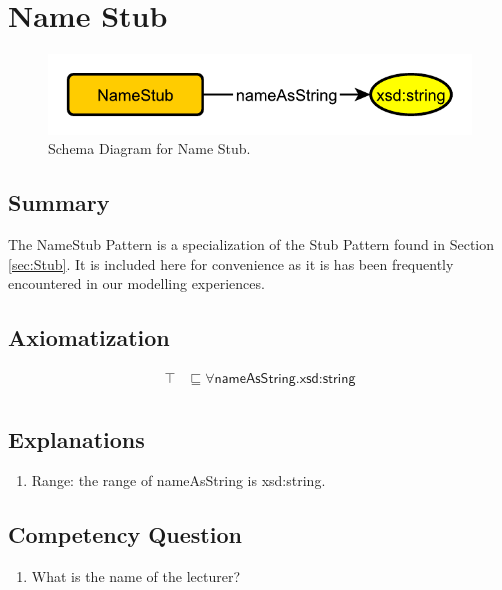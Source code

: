 \section{Name Stub}
\label{sec:Name}
\begin{figure}[h!]
\begin{center}
\includegraphics[width=.7\textwidth]{figures/name}
\end{center}
\caption{Schema Diagram for Name Stub.}
\label{fig:Name}
\end{figure}
\subsection{Summary}
\label{sum:Name}
The \textsf{NameStub} Pattern is a specialization of the \textsf{Stub} Pattern found in Section \ref{sec:Stub}. It is included here for convenience as it is has been frequently encountered in our modelling experiences.

\subsection{Axiomatization}
\label{axs:Name}
\begin{align}
\top &\sqsubseteq \forall \textsf{nameAsString.xsd:string} \\ 
\end{align}

\subsection{Explanations}
\label{exp:Name}
\begin{enumerate}
\item Range: the range of \textsf{nameAsString} is \textsf{xsd:string}.
\end{enumerate}

\subsection{Competency Question}
\label{cqs:Name}
\begin{enumerate}[CQ1.]
\item What is the name of the lecturer?
\end{enumerate}

\newpage
